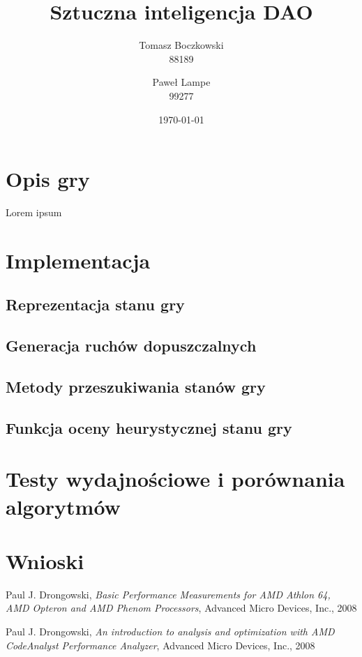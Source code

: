\documentclass{scrartcl}
\title{Sztuczna inteligencja DAO}
\date{\today}
\author{Tomasz Boczkowski\\ 88189 \and Paweł Lampe\\ 99277}
\begin{document}


\section{Opis gry}

Lorem ipsum

\section{Implementacja}

\subsection{Reprezentacja stanu gry}

\subsection{Generacja ruchów dopuszczalnych}

\subsection{Metody przeszukiwania stanów gry}

\subsection{Funkcja oceny heurystycznej stanu gry}

\section{Testy wydajnościowe i porównania algorytmów}

\section{Wnioski}

\begin{thebibliography}{9}

 Paul J. Drongowski,
  \emph{Basic Performance Measurements for AMD Athlon 64, 
AMD Opteron and AMD Phenom Processors}, Advanced Micro Devices, Inc.,
  2008

 Paul J. Drongowski,
  \emph{An introduction to analysis and optimization 
with AMD CodeAnalyst Performance Analyzer}, Advanced Micro Devices, Inc.,
  2008

\end{thebibliography}
\end{document}
